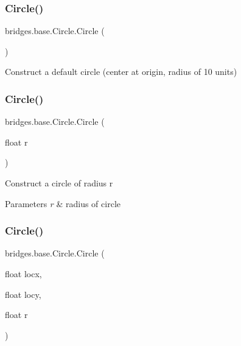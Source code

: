 \subsubsection{\texorpdfstring{Circle()}{Circle()}\hspace{0.1cm}{\footnotesize\ttfamily [1/3]}}
{\footnotesize\ttfamily bridges.\+base.\+Circle.\+Circle (\begin{DoxyParamCaption}{ }\end{DoxyParamCaption})}

Construct a default circle (center at origin, radius of 10 units) \mbox{\label{classbridges_1_1base_1_1_circle_a32543e951646009960c1839b2b8e1a0a}} 
\subsubsection{\texorpdfstring{Circle()}{Circle()}\hspace{0.1cm}{\footnotesize\ttfamily [2/3]}}
{\footnotesize\ttfamily bridges.\+base.\+Circle.\+Circle (\begin{DoxyParamCaption}\item[{float}]{r }\end{DoxyParamCaption})}

Construct a circle of radius r 
\begin{DoxyParams}{Parameters}
{\em r} & radius of circle \\
\hline
\end{DoxyParams}
\mbox{\label{classbridges_1_1base_1_1_circle_a04460bea57f9ef4bd0a3d45e9a937096}} 
\subsubsection{\texorpdfstring{Circle()}{Circle()}\hspace{0.1cm}{\footnotesize\ttfamily [3/3]}}
{\footnotesize\ttfamily bridges.\+base.\+Circle.\+Circle (\begin{DoxyParamCaption}\item[{float}]{locx,  }\item[{float}]{locy,  }\item[{float}]{r }\end{DoxyParamCaption})}

